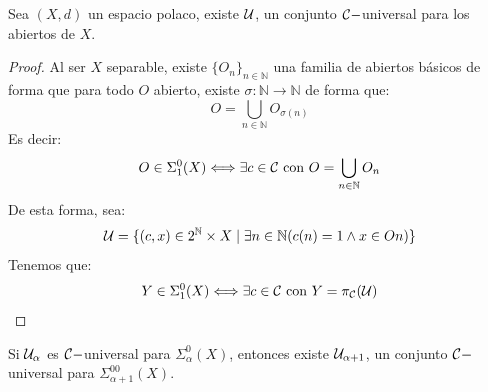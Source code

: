 \begin{lema}
    Sea $(X,d)$ un espacio polaco, existe $\mathcal{U}$, un conjunto $\mathcal{C}-$universal para los abiertos de $X$.
    \begin{proof}
        Al ser $X$ separable, existe ${\{O_n\}}_{n\in \mathbb{N}}$ una familia de abiertos básicos de forma que para todo $O$ abierto, existe $\sigma:\mathbb{N}\to\mathbb{N}$ de forma que:
        \begin{equation*}
            O = \bigcup_{n\in \mathbb{N}} O_{\sigma(n)}
        \end{equation*}
        Es decir:
        \begin{equation*}
            O\in \Sigma^0_1(X) \Longleftrightarrow \exists c\in \mathcal{C} \text{\ con\ } O = \bigcup_{n\in \mathbb{N}} O_n
        \end{equation*}
        De esta forma, sea:
        \begin{equation*}
            \mathcal{U} = \{(c,x)\in 2^\mathbb{N}\times X \mid \exists n\in \mathbb{N} (c(n)=1\land x\in On)\}
        \end{equation*}
        Tenemos que:
        \begin{equation*}
            Y\in \Sigma^0_1(X) \Longleftrightarrow \exists c\in \mathcal{C} \text{\ con\ } Y = \pi_{\mathcal{C}}(\mathcal{U})
        \end{equation*}
    \end{proof}
\end{lema}

\begin{lema}
    Si $\mathcal{U}_\alpha$ es $\mathcal{C}-$universal para $\Sigma^0_\alpha(X)$, entonces existe $\mathcal{U}_{\alpha+1}$, un conjunto $\mathcal{C}-$universal para $\Sigma^00_{\alpha+1}(X)$.
\end{lema}

